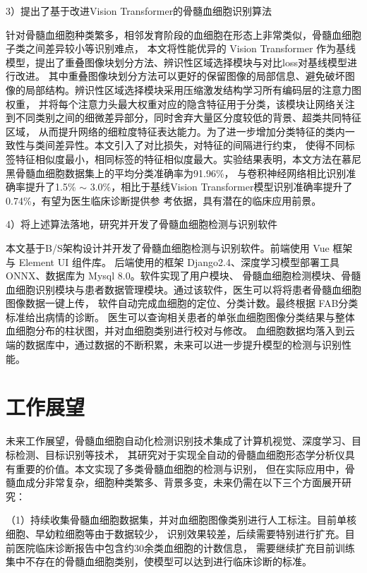3）提出了基于改进Vision Transformer的骨髓血细胞识别算法

针对骨髓血细胞种类繁多，相邻发育阶段的血细胞在形态上非常类似，骨髓血细胞子类之间差异较小等识别难点，
本文将性能优异的 Vision Transformer 作为基线模型，提出了重叠图像块划分方法、辨识性区域选择模块与对比loss对基线模型进行改进。
其中重叠图像块划分方法可以更好的保留图像的局部信息、避免破坏图像的局部结构。辨识性区域选择模块采用压缩激发结构学习所有编码层的注意力图权重，
并将每个注意力头最大权重对应的隐含特征用于分类，该模块让网络关注到不同类别之间的细微差异部分，同时舍弃大量区分度较低的背景、超类共同特征区域，
从而提升网络的细粒度特征表达能力。为了进一步增加分类特征的类内一致性与类间差异性。本文引入了对比损失，对特征的间隔进行约束，
使得不同标签特征相似度最小，相同标签的特征相似度最大。实验结果表明，本文方法在慕尼黑骨髓血细胞数据集上的平均分类准确率为91.96\%，
与卷积神经网络相比识别准确率提升了1.5\% $\sim$ 3.0\%，相比于基线Vision Transformer模型识别准确率提升了0.74\%，有望为医生临床诊断提供参
考依据，具有潜在的临床应用前景。

4）将上述算法落地，研究并开发了骨髓血细胞检测与识别软件

本文基于B/S架构设计并开发了骨髓血细胞检测与识别软件。前端使用 Vue 框架与 Element UI 组件库。
后端使用的框架 Django2.4、深度学习模型部署工具 ONNX、数据库为 Mysql 8.0。软件实现了用户模块、
骨髓血细胞检测模块、骨髓血细胞识别模块与患者数据管理模块。通过该软件，医生可以将将患者骨髓血细胞图像数据一键上传，
软件自动完成血细胞的定位、分类计数。最终根据 FAB分类标准给出病情的诊断。
医生可以查询相关患者的单张血细胞图像分类结果与整体血细胞分布的柱状图，并对血细胞类别进行校对与修改。
血细胞数据均落入到云端的数据库中，通过数据的不断积累，未来可以进一步提升模型的检测与识别性能。

\section{工作展望}

未来工作展望，骨髓血细胞自动化检测识别技术集成了计算机视觉、深度学习、目标检测、目标识别等技术，
其研究对于实现全自动的骨髓血细胞形态学分析仪具有重要的价值。本文实现了多类骨髓血细胞的检测与识别，
但在实际应用中，骨髓血成分非常复杂，细胞种类繁多、背景多变，未来仍需在以下三个方面展开研究：

（1）持续收集骨髓血细胞数据集，并对血细胞图像类别进行人工标注。目前单核细胞、早幼粒细胞等由于数据较少，
识别效果较差，后续需要特别进行扩充。目前医院临床诊断报告中包含约30余类血细胞的计数信息，
需要继续扩充目前训练集中不存在的骨髓血细胞类别，使模型可以达到进行临床诊断的标准。


